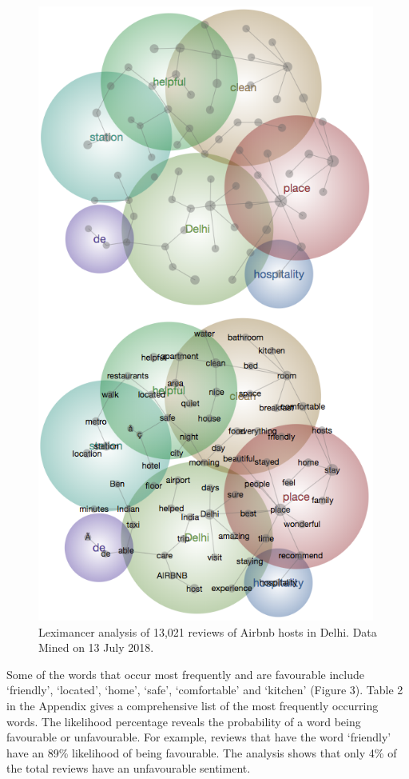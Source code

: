 \documentclass[a4paper, 12pt]{article}
\begin{document}
\begin{figure}[h!]
\centering
\includegraphics[height=8in]{figure6.png} 
\caption{Leximancer analysis of 13,021 reviews of Airbnb hosts in Delhi. Data Mined on 13 July 2018.}
\end{figure}

Some of the words that occur most frequently and are favourable include ‘friendly’, ‘located’, ‘home’, ‘safe’, ‘comfortable’ and ‘kitchen’ (Figure 3). Table 2 in the Appendix gives a comprehensive list of the most frequently occurring words. The likelihood percentage reveals the probability of a word being favourable or unfavourable. For example, reviews that have the word ‘friendly’ have an 89\% likelihood of being favourable. The analysis shows that only 4\% of the total reviews have an unfavourable sentiment.\\
\end{document}
